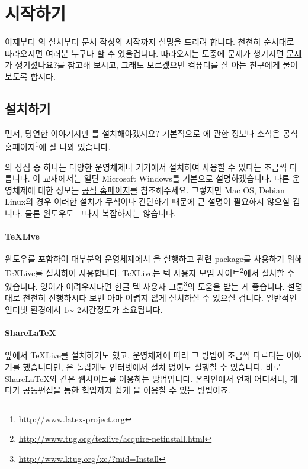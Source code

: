 
\section{\lt 시작하기}
\label{sec:beginning}

이제부터 \lt 의 설치부터 문서 작성의 시작까지 설명을 드리려 합니다.
천천히 순서대로 따라오시면 여러분 누구나 할 수 있을겁니다.
따라오시는 도중에 문제가 생기시면 \hyperref[sec2:problem]{문제가 생기셨나요?}를 참고해 보시고, 그래도 모르겠으면 컴퓨터를 잘 아는 친구에게 물어보도록 합시다.

\subsection{\lt 설치하기}
\label{sec:lt-install}
먼저, 당연한 이야기지만 \lt 를 설치해야겠지요? 기본적으로 \lt 에 관한 정보나 소식은 공식 홈페이지\footnote{\url{http://www.latex-project.org}}에 잘 나와 있습니다.

\lt 의 장점 중 하나는 다양한 운영체제나 기기에서 설치하여 사용할 수 있다는 조금씩 다릅니다. 이 교재에서는 일단 Microsoft Windows를 기본으로 설명하겠습니다. 다른 운영체제에 대한 정보는 \href{http://www.latex-project.org}{공식 홈페이지}를 참조해주세요. 그렇지만 Mac OS, Debian Linux의 경우 이러한 설치가 무척이나 간단하기 때문에 큰 설명이 필요하지 않으실 겁니다. 물론 윈도우도 그다지 복잡하지는 않습니다.

\paragraph{\TeX Live}
윈도우를 포함하여 대부분의 운영체제에서 \lt 을 실행하고 관련 package를 사용하기 위해 \TeX Live를 설치하여 사용합니다. \TeX Live는 텍 사용자 모임 사이트\footnote{\url{http://www.tug.org/texlive/acquire-netinstall.html}}에서 설치할 수 있습니다. 영어가 어려우시다면 한글 텍 사용자 그룹\footnote{\url{http://www.ktug.org/xe/?mid=Install}}의 도움을 받는 게 좋습니다. 설명대로 천천히 진행하시다 보면 아마 어렵지 않게 설치하실 수 있으실 겁니다. 일반적인 인터넷 환경에서 1$\sim$ 2시간정도가 소요됩니다.

\paragraph{ShareLaTeX}
앞에서 \TeX Live를 설치하기도 했고, 운영체제에 따라 그 방법이 조금씩 다르다는 이야기를 했습니다만, \lt 은 놀랍게도 인터넷에서 설치 없이도 실행할 수 있습니다. 바로 \href{https://www.sharelatex.com/}{ShareLaTeX}와 같은 웹사이트를 이용하는 방법입니다. 온라인에서 언제 어디서나, 게다가 공동편집을 통한 협업까지 쉽게 \lt 을 이용할 수 있는 방법이죠.

